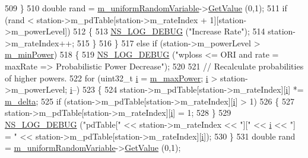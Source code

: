 \begin{DoxyCode}
509             \}
510           \textcolor{keywordtype}{double} rand = \hyperlink{classns3_1_1RrpaaWifiManager_a04e94944516bbae00d3873065258aaad}{m\_uniformRandomVariable}->\hyperlink{classns3_1_1UniformRandomVariable_a03822d8c86ac51e9aa83bbc73041386b}{GetValue} (0,1);
511           \textcolor{keywordflow}{if} (rand < station->m\_pdTable[station->m\_rateIndex + 1][station->m\_powerLevel])
512             \{
513               \hyperlink{group__logging_ga413f1886406d49f59a6a0a89b77b4d0a}{NS\_LOG\_DEBUG} (\textcolor{stringliteral}{"Increase Rate"});
514               station->m\_rateIndex++;
515             \}
516         \}
517       \textcolor{keywordflow}{else} \textcolor{keywordflow}{if} (station->m\_powerLevel > \hyperlink{classns3_1_1RrpaaWifiManager_a2df897d246e52f36e94520c70a9026ab}{m\_minPower})
518         \{
519           \hyperlink{group__logging_ga413f1886406d49f59a6a0a89b77b4d0a}{NS\_LOG\_DEBUG} (\textcolor{stringliteral}{"wploss <= ORI and rate = maxRate => Probabilistic Power Decrease"});
520 
521           \textcolor{comment}{// Recalculate probabilities of higher powers.}
522           \textcolor{keywordflow}{for} (uint32\_t \hyperlink{bernuolliDistribution_8m_a6f6ccfcf58b31cb6412107d9d5281426}{i} = \hyperlink{classns3_1_1RrpaaWifiManager_a8f5659ec5d99c385dcde039364b0ec8a}{m\_maxPower}; \hyperlink{bernuolliDistribution_8m_a6f6ccfcf58b31cb6412107d9d5281426}{i} > station->m\_powerLevel; \hyperlink{bernuolliDistribution_8m_a6f6ccfcf58b31cb6412107d9d5281426}{i}--)
523             \{
524               station->m\_pdTable[station->m\_rateIndex][\hyperlink{bernuolliDistribution_8m_a6f6ccfcf58b31cb6412107d9d5281426}{i}] *= \hyperlink{classns3_1_1RrpaaWifiManager_aca7d4b5e9e8758b935433bc5c9ad24af}{m\_delta};
525               \textcolor{keywordflow}{if} (station->m\_pdTable[station->m\_rateIndex][\hyperlink{bernuolliDistribution_8m_a6f6ccfcf58b31cb6412107d9d5281426}{i}] > 1)
526                 \{
527                   station->m\_pdTable[station->m\_rateIndex][\hyperlink{bernuolliDistribution_8m_a6f6ccfcf58b31cb6412107d9d5281426}{i}] = 1;
528                 \}
529               \hyperlink{group__logging_ga413f1886406d49f59a6a0a89b77b4d0a}{NS\_LOG\_DEBUG} (\textcolor{stringliteral}{"pdTable["} << station->m\_rateIndex << \textcolor{stringliteral}{"]["} << 
      \hyperlink{bernuolliDistribution_8m_a6f6ccfcf58b31cb6412107d9d5281426}{i} << \textcolor{stringliteral}{"] = "} << station->m\_pdTable[station->m\_rateIndex][\hyperlink{bernuolliDistribution_8m_a6f6ccfcf58b31cb6412107d9d5281426}{i}]);
530             \}
531           \textcolor{keywordtype}{double} rand = \hyperlink{classns3_1_1RrpaaWifiManager_a04e94944516bbae00d3873065258aaad}{m\_uniformRandomVariable}->\hyperlink{classns3_1_1UniformRandomVariable_a03822d8c86ac51e9aa83bbc73041386b}{GetValue} (0,1);

\end{DoxyCode}
